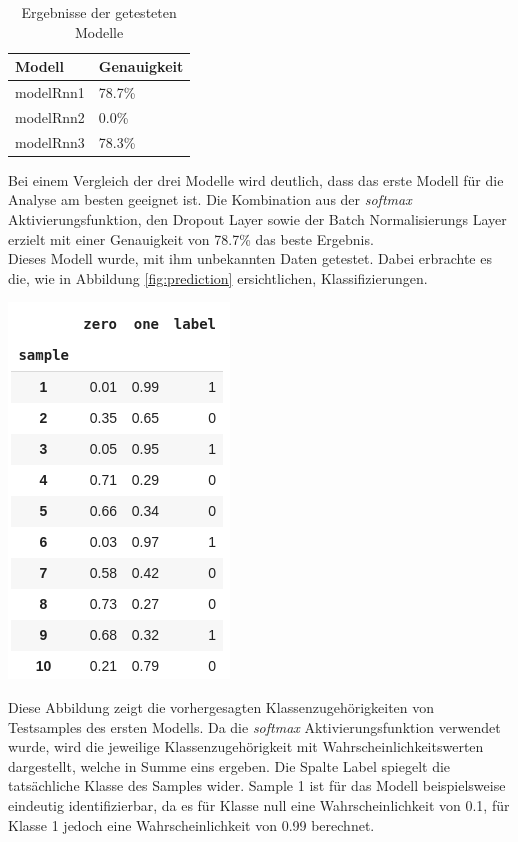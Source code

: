\documentclass[
    12pt, %
    DIV10,
    ngerman, %
    a4paper, %
    oneside, %
    titlepage, %
    parskip=half, %
    headings=normal, %
    listof=totoc, %
    bibliography=totoc, %
    index=totoc, %
    captions=tableheading, %
    final %
]{scrreprt}
\begin{document}
\begin{table}[H]
\begin{center}
\begin{tabular}{ll}
\hline
\textbf{Modell}     & \textbf{Genauigkeit} \\ \hline
modelRnn1 & 78.7\%        \\ \hline
modelRnn2 & 0.0\%         \\ \hline
modelRnn3 & 78.3\%        \\ \hline
\end{tabular}
\caption{Ergebnisse der getesteten Modelle}\label{tab:models}
\label{tab:acc}
\end{center}
\end{table}
Bei einem Vergleich der drei Modelle wird deutlich, dass das erste Modell für die Analyse am besten geeignet ist. Die Kombination aus der \emph{softmax} Aktivierungsfunktion, den Dropout Layer sowie der Batch Normalisierungs Layer erzielt mit einer Genauigkeit von 78.7\% das beste Ergebnis.\\
Dieses Modell wurde, mit ihm unbekannten Daten getestet. Dabei erbrachte es die, wie in Abbildung \ref{fig:prediction} ersichtlichen, Klassifizierungen.
\begin{center}
\includegraphics[scale=0.7]{img/predictions.png}
\label{fig:prediction}
\end{center}
Diese Abbildung zeigt die vorhergesagten Klassenzugehörigkeiten von Testsamples des ersten Modells. Da die \emph{softmax}
Aktivierungsfunktion verwendet wurde, wird die jeweilige Klassenzugehörigkeit mit Wahrscheinlichkeitswerten dargestellt, welche in Summe eins ergeben. Die Spalte Label spiegelt die tatsächliche Klasse des Samples wider. Sample 1 ist für das Modell beispielsweise eindeutig identifizierbar, da es für Klasse null eine Wahrscheinlichkeit von 0.1, für Klasse 1 jedoch eine Wahrscheinlichkeit von 0.99 berechnet. 
\end{document}
